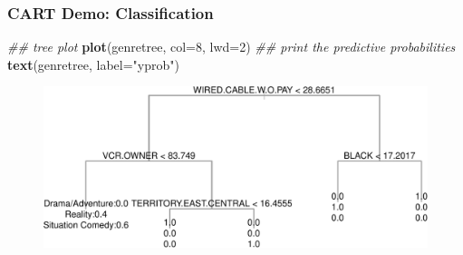 \documentclass[
  shownotes,
  xcolor={svgnames},
  hyperref={colorlinks,citecolor=DarkBlue,linkcolor=DarkRed,urlcolor=DarkBlue}
  , aspectratio=169]{beamer}
\newenvironment{Shaded}{\begin{snugshade}}{\end{snugshade}}
\newcommand{\CommentTok}[1]{\textcolor[rgb]{0.56,0.35,0.01}{\textit{#1}}}
\newcommand{\DataTypeTok}[1]{\textcolor[rgb]{0.13,0.29,0.53}{#1}}
\newcommand{\DecValTok}[1]{\textcolor[rgb]{0.00,0.00,0.81}{#1}}
\newcommand{\KeywordTok}[1]{\textcolor[rgb]{0.13,0.29,0.53}{\textbf{#1}}}
\newcommand{\NormalTok}[1]{#1}
\newcommand{\StringTok}[1]{\textcolor[rgb]{0.31,0.60,0.02}{#1}}
\begin{document}
\begin{frame}[fragile]
\frametitle{CART Demo: Classification}

\begin{scriptsize}
\begin{Shaded}
\begin{Highlighting}[]
\CommentTok{\#\# tree plot}
\KeywordTok{plot}\NormalTok{(genretree, }\DataTypeTok{col=}\DecValTok{8}\NormalTok{, }\DataTypeTok{lwd=}\DecValTok{2}\NormalTok{)}
\CommentTok{\#\# print the predictive probabilities}
\KeywordTok{text}\NormalTok{(genretree, }\DataTypeTok{label=}\StringTok{"yprob"}\NormalTok{)}
\end{Highlighting}
\end{Shaded}
\end{scriptsize}

\begin{figure}[H] \centering
            \captionsetup{justification=centering}
              \includegraphics[scale=0.55]{figures/unnamed-chunk-9-1.pdf}
 \end{figure}



\end{frame}
\end{document}
